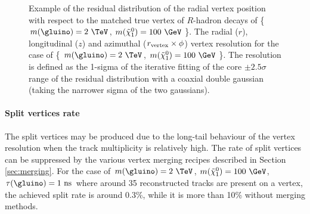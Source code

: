 \begin{figure}[tbp]
\begin{center}
\caption{ Example of the residual distribution of the radial vertex position with respect to the matched true vertex of $R$-hadron decays of \{ $m(\gluino) = 2~\TeV$, $m(\tilde{\chi}_{1}^{0}) = 100~\GeV$ \}.  The radial ($r$), longitudinal ($z$) and azimuthal ($r_{\rm vertex}\times\phi$) vertex resolution for the case of \{ $m(\gluino) = 2~\TeV$, $m(\tilde{\chi}_{1}^{0}) = 100~\GeV$ \}. The resolution is defined as the 1-sigma of the iterative fitting of the core $\pm2.5\sigma$ range of the residual distribution with a coaxial double gaussian (taking the narrower sigma of the two gaussians).}
\label{fig:Rhadron_trackType}
\end{center}
\end{figure}

\paragraph{Split vertices rate}
The split vertices may be produced due to the long-tail behaviour of the vertex resolution when the track multiplicity is relatively high. The rate of split vertices can be suppressed by the various vertex merging recipes described in Section \ref{sec:merging}. For the case of $m(\gluino) = 2~\TeV$, $m(\tilde{\chi}_{1}^{0}) = 100~\GeV$, $\tau(\gluino) = 1~{\rm ns}$ where around 35 reconstructed tracks are present on a vertex, the achieved split rate is around 0.3\%, while it is more than 10\% without merging methods.

